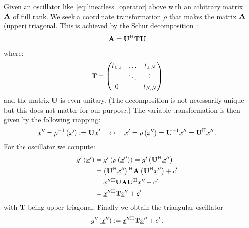 \documentclass[a4paper,10pt]{article}
\begin{document}
Given an oscillator like~\eqref{eq:linearless_operator} above
with an arbitrary matrix $\mathbf{A}$ of full rank. We seek a coordinate
transformation $\rho$ that makes the matrix $\mathbf{A}$ (upper) triagonal.
This is achieved by the Schur decomposition~\cite{matcomp}:
\begin{equation}
 \mathbf{A} = \mathbf{U}{}^{\textnormal{H}} \mathbf{T} \mathbf{U}
\end{equation}
where:
\begin{equation}
  \mathbf{T} =
  \begin{pmatrix}
    t_{1,1} & \hdots & t_{1,N} \\
            & \ddots & \vdots \\
    0       &        & t_{N,N}
  \end{pmatrix}
\end{equation}
and the matrix $\mathbf{U}$ is even unitary.
(The decomposition is not necessarily unique but this does not matter for our purpose.)
The variable transformation is then given by the following mapping:
\begin{equation}\label{eq:transform_rho}
 \underline{x}^{\prime\prime} = \rho^{-1}\left(\underline{x}^{\prime}\right) := \mathbf{U} \underline{x}^{\prime}
 \quad \leftrightarrow \quad
 \underline{x}^{\prime} = \rho\left(\underline{x}^{\prime\prime}\right) = \mathbf{U}{}^{-1} \underline{x}^{\prime\prime} = \mathbf{U}{}^{\textnormal{H}} \underline{x}^{\prime\prime} \,.
\end{equation}
For the oscillator we compute:
\begin{equation}
\begin{split}
 g^{\prime}\left(\underline{x}^{\prime}\right)
 & = g^{\prime}\left(\rho\left(\underline{x}^{\prime\prime}\right)\right)
   = g^{\prime}\left(\mathbf{U}{}^{\textnormal{H}} \underline{x}^{\prime\prime}\right) \\
 & = \left(\mathbf{U}{}^{\textnormal{H}} \underline{x}^{\prime\prime}\right){}^{\textnormal{H}} \mathbf{A} \left(\mathbf{U}{}^{\textnormal{H}} \underline{x}^{\prime\prime}\right)
   + c^{\prime} \\
 & = \underline{x}^{\prime\prime}{}^{\textnormal{H}} \mathbf{U} \mathbf{A} \mathbf{U}{}^{\textnormal{H}} \underline{x}^{\prime\prime}
   + c^{\prime} \\
 & = \underline{x}^{\prime\prime}{}^{\textnormal{H}} \mathbf{T} \underline{x}^{\prime\prime}
   + c^{\prime}
\end{split}
\end{equation}
with $\mathbf{T}$ being upper triagonal. Finally we obtain
the triangular oscillator:
\begin{equation}
  g^{\prime\prime}\left(\underline{x}^{\prime\prime}\right) := \underline{x}^{\prime\prime}{}^{\textnormal{H}} \mathbf{T} \underline{x}^{\prime\prime} + c^{\prime} \,.
\end{equation}
\end{document}
